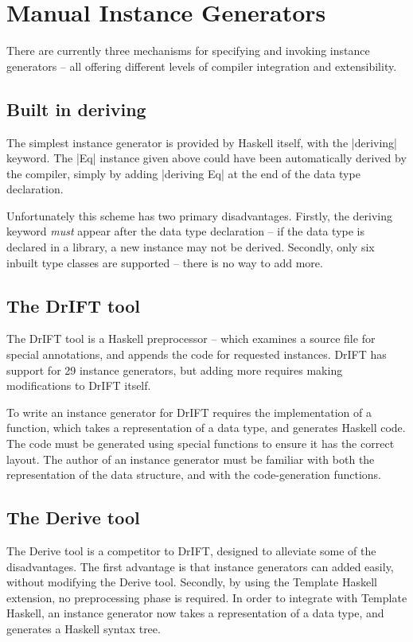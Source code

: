 \documentclass{llncs}
\begin{document}
\section{Manual Instance Generators}
\label{sec:manual_instances}

There are currently three mechanisms for specifying and invoking instance generators -- all offering different levels of compiler integration and extensibility.

\subsection{Built in deriving}

The simplest instance generator is provided by Haskell itself, with the |deriving| keyword. The |Eq| instance given above could have been automatically derived by the compiler, simply by adding |deriving Eq| at the end of the data type declaration.

Unfortunately this scheme has two primary disadvantages. Firstly, the deriving keyword \textit{must} appear after the data type declaration -- if the data type is declared in a library, a new instance may not be derived. Secondly, only six inbuilt type classes are supported -- there is no way to add more.

\subsection{The DrIFT tool}

The DrIFT tool \cite{drift} is a Haskell preprocessor -- which examines a source file for special annotations, and appends the code for requested instances. DrIFT has support for 29 instance generators, but adding more requires making modifications to DrIFT itself.

To write an instance generator for DrIFT requires the implementation of a function, which takes a representation of a data type, and generates Haskell code. The code must be generated using special functions to ensure it has the correct layout. The author of an instance generator must be familiar with both the representation of the data structure, and with the code-generation functions.

\subsection{The Derive tool}

The Derive tool \cite{derive} is a competitor to DrIFT, designed to alleviate some of the disadvantages. The first advantage is that instance generators can added easily, without modifying the Derive tool. Secondly, by using the Template Haskell \cite{template_haskell} extension, no preprocessing phase is required. In order to integrate with Template Haskell, an instance generator now takes a representation of a data type, and generates a Haskell syntax tree.
\end{document}
